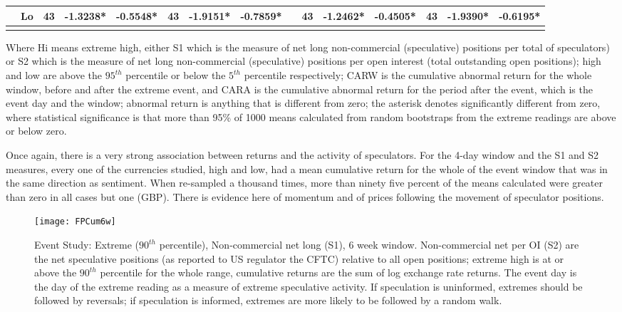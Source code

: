 \documentclass[ijfs,article,submit,oneauthor,pdftex,10pt,a4paper]{mdpi}
\begin{document}
\begin{sidewaystable}
\begin{threeparttable}
\begin{tabular}{llccccccccccccc}
& Lo & 43 &-1.3238* & -0.5548* & 43 & -1.9151* & -0.7859* & & 43 & -1.2462* & -0.4505*  &43 & -1.9390*  & -0.6195*  \\
\hline
\label{tabref:SP1}
\end{tabular}
\begin{tablenotes}
\small 
\item Where Hi means extreme high, either S1 which is the measure of net long non-commercial (speculative) positions per total of speculators) or S2 which is the measure of net long non-commercial (speculative) positions per open interest (total outstanding open positions); high and low are above the $95^{th}$ percentile or below the $5^{th}$ percentile respectively; CARW is the cumulative abnormal return for the whole window, before and after the extreme event, and CARA is the cumulative abnormal return for the period after the event, which is the event day and the window; abnormal return is anything that is different from zero; the asterisk denotes significantly different from zero, where statistical significance is that more than 95\% of 1000 means calculated from random bootstraps from the extreme readings are above or below zero.   
\end{tablenotes}	
\end{threeparttable}  
\end{sidewaystable}

Once again, there is a very strong association between returns and the activity of speculators.  For the 4-day window and the S1 and S2 measures, every one of the currencies studied, high and low, had a mean cumulative return for the whole of the event window that was in the same direction as sentiment.  When re-sampled a thousand times, more than ninety five percent of the means calculated were greater than zero in all cases but one (GBP).  There is evidence here of momentum and of prices following the movement of speculator positions. 

\begin{figure}
\graphicspath{{../Figures/}}
\centering
\texttt{[image: FPCum6w]}
\caption{Event Study:  Extreme ($90^{th}$ percentile), Non-commercial net long (S1), 6 week window. Non-commercial net per OI (S2) are the net speculative positions (as reported to US regulator the CFTC) relative to all open positions; extreme high is at or above the $90^{th}$ percentile for the whole range, cumulative returns are the sum of log exchange rate returns. The event day is the day of the extreme reading as a measure of extreme speculative activity.  If speculation is uninformed, extremes should be followed by reversals; if speculation is informed, extremes are more likely to be followed by a random walk.}
\label{fig:ES3}
\end{figure}
\end{document}

